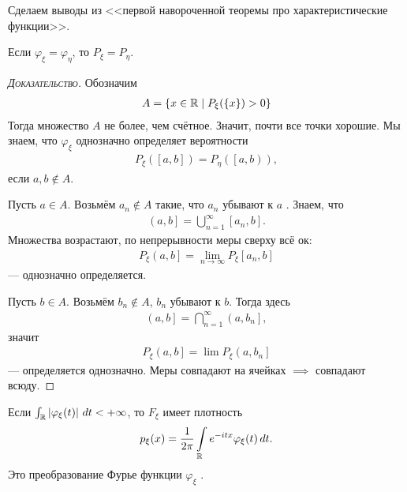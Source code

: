 \documentclass[../main.tex]{subfiles}
\begin{document}
Сделаем выводы из <<первой навороченной теоремы про характеристические функции>>.

\begin{crly}
 Если $ \varphi_\xi = \varphi_\eta $, то $ P_\xi = P_\eta $.
\end{crly}
\begin{proof}[\normalfont\textsc{Доказательство}]
 Обозначим
 \begin{align*}
 A = \left\{ x \in \mathbb{R} \;\middle|\; P_\xi(\left\{ x \right\}) > 0 \right\}
 \end{align*} Тогда множество $ A $ не более, чем счётное. Значит, почти все точки хорошие. Мы знаем, что $ \varphi_\xi $ однозначно определяет вероятности
 \begin{align*}
  P_\xi([a,b]) = P_\eta( \left[a, b\right)),
 \end{align*} если $ a,b \notin A $.

 Пусть $ a \in A $.  Возьмём  $ a_n \notin A $ такие, что  $ a_n $ убывают к  $ a $ . Знаем, что
 \begin{align*}
  \left(a, b\right]  = \bigcup_{n=1}^{\infty}[a_n,b].
 \end{align*} Множества возрастают, по непрерывности меры сверху всё ок:
 \begin{align*}
  P_\xi \left(a, b\right] = \lim_{n \to \infty} P_\xi [a_n,b] 
 \end{align*} --- однозначно определяется.

 Пусть $ b \in A $. Возьмём  $ b_n \notin A $,  $ b_n $ убывают к  $ b $. Тогда здесь
 \begin{align*}
  \left(a, b\right] = \bigcap_{n=1}^{\infty} \left(a, b_n\right] ,
 \end{align*} значит
 \begin{align*}
  P_\xi \left(a, b\right] = \lim P_\xi \left(a, b_n\right]   
 \end{align*} --- определяется однозначно. Меры совпадают на ячейках $  \implies $ совпадают всюду.
 
\end{proof}
\begin{crly}
 Если $ \int_{\mathbb{R}} \left| \varphi_\xi(t) \right|\,dt < +\infty  $, то $ F_\xi $ имеет плотность
 \begin{align*}
  p_\xi(x) = \frac{1}{2\pi} \int\limits_{\mathbb{R}} e^{-itx}\varphi_\xi(t)\,dt. 
 \end{align*} Это преобразование Фурье функции $\varphi_\xi$ .
\end{crly}
\end{document}
